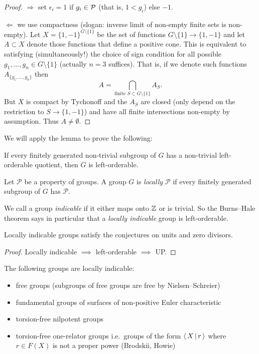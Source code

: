 \begin{proof}
    $\Rightarrow$ set $\epsilon_i = 1$ if $g_i \in \mathcal{P}$ (that is, $1 < g_i$) else $-1$.

    $\Leftarrow$ we use compactness (slogan: inverse limit of non-empty finite sets is non-empty).
    Let $X = \{1, -1\}^{G \setminus \{1\}}$ be the set of functions $G \setminus \{1\} \to \{1, -1\}$ and let $A \subset X$ denote those functions that define a positive cone.
    This is equivalent to satisfying (simultaneously!) the choice of sign condition for all possible $g_1, \dots, g_n \in G \setminus \{1\}$ (actually $n = 3$ suffices).
    That is, if we denote such functions $A_{\{g_1, \dots, g_n\}}$ then \[
        A = \bigcap_{\text{finite } S \subset G \setminus \{1\}} A_S.
    \]
    But $X$ is compact by Tychonoff and the $A_S$ are closed (only depend on the restriction to $S \to \{1, -1\}$) and have all finite intersections non-empty by assumption.
    Thus $A \neq \emptyset$.
\end{proof}

We will apply the lemma to prove the following:
\begin{theorem}
    \label{theorem:burns_hale}
    If every finitely generated non-trivial subgroup of $G$ has a non-trivial left-orderable quotient, then $G$ is left-orderable.
\end{theorem}

\begin{definition}
    Let $\mathcal{P}$ be a property of groups.
    A group $G$ is \emph{locally $\mathcal{P}$} if every finitely generated subgroup of $G$ has $\mathcal{P}$.
\end{definition}

We call a group \emph{indicable} if it either maps onto $\mathbb{Z}$ or is trivial.
So the Burns--Hale theorem says in particular that a \emph{locally indicable} group is left-orderable.

\begin{corollary}[Higman, 1940]
    \label{corollary:LI_kaplansky}
    Locally indicable groups satisfy the conjectures on units and zero divisors.
\end{corollary}

\begin{proof}
    Locally indicable $\implies$ left-orderable $\implies$ UP.
\end{proof}

\begin{example}
    The following groups are locally indicable:
    \begin{itemize}
        \item free groups (subgroups of free groups are free by Nielsen--Schreier)
        \item fundamental groups of surfaces of non-positive Euler characteristic
        \item torsion-free nilpotent groups
        \item torsion-free one-relator groups i.e.\ groups of the form $\langle \, X \, | \, r \, \rangle$ where $r \in F(X)$ is not a proper power (Brodskii, Howie)
    \end{itemize}
\end{example}

